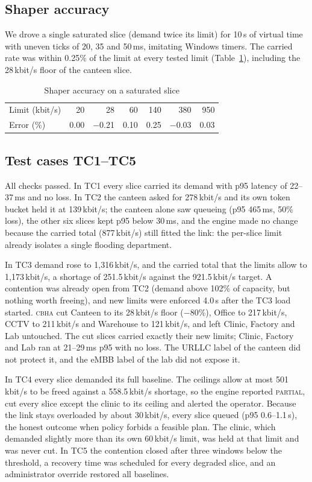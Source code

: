 \documentclass[conference]{IEEEtran}
\newcommand{\cbha}{\textsc{cbha}}
\newcommand{\kbps}{\,kbit/s}
\begin{document}
\subsection{Shaper accuracy}
We drove a single saturated slice (demand twice its limit) for 10\,s of virtual time with uneven ticks of 20, 35 and 50\,ms, imitating Windows timers. The carried rate was within 0.25\% of the limit at every tested limit (Table~\ref{tab:shaper}), including the 28\kbps{} floor of the canteen slice.

\begin{table}[t]
\caption{Shaper accuracy on a saturated slice}
\label{tab:shaper}
\centering
\footnotesize
\begin{tabular}{@{}lrrrrrr@{}}
\toprule
Limit (kbit/s) & 20 & 28 & 60 & 140 & 380 & 950 \\
Error (\%) & 0.00 & $-$0.21 & 0.10 & 0.25 & $-$0.03 & 0.03 \\
\bottomrule
\end{tabular}
\end{table}

\subsection{Test cases TC1--TC5}
All checks passed. In TC1 every slice carried its demand with p95 latency of 22--37\,ms and no loss. In TC2 the canteen asked for 278\kbps{} and its own token bucket held it at 139\kbps{}; the canteen alone saw queueing (p95 465\,ms, 50\% loss), the other six slices kept p95 below 30\,ms, and the engine made no change because the carried total (877\kbps{}) still fitted the link: the per-slice limit already isolates a single flooding department.

In TC3 demand rose to 1{,}316\kbps{}, and the carried total that the limits allow to 1{,}173\kbps{}, a shortage of 251.5\kbps{} against the 921.5\kbps{} target. A contention was already open from TC2 (demand above 102\% of capacity, but nothing worth freeing), and new limits were enforced 4.0\,s after the TC3 load started. \cbha{} cut Canteen to its 28\kbps{} floor ($-$80\%), Office to 217\kbps{}, CCTV to 211\kbps{} and Warehouse to 121\kbps{}, and left Clinic, Factory and Lab untouched. The cut slices carried exactly their new limits; Clinic, Factory and Lab ran at 21--29\,ms p95 with no loss. The URLLC label of the canteen did not protect it, and the eMBB label of the lab did not expose it.

In TC4 every slice demanded its full baseline. The ceilings allow at most 501\kbps{} to be freed against a 558.5\kbps{} shortage, so the engine reported \textsc{partial}, cut every slice except the clinic to its ceiling and alerted the operator. Because the link stays overloaded by about 30\kbps{}, every slice queued (p95 0.6--1.1\,s), the honest outcome when policy forbids a feasible plan. The clinic, which demanded slightly more than its own 60\kbps{} limit, was held at that limit and was never cut. In TC5 the contention closed after three windows below the threshold, a recovery time was scheduled for every degraded slice, and an administrator override restored all baselines.
\end{document}
